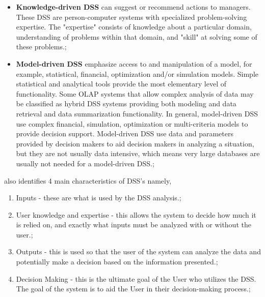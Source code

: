 \begin {itemize}
\item \textbf{Knowledge-driven DSS} can suggest or recommend actions to managers. These DSS are person-computer systems with specialized problem-solving expertise. The "expertise" consists of knowledge about a particular domain, understanding of problems within that domain, and "skill" at solving some of these problems.;
\item \textbf{Model-driven DSS} emphasize access to and manipulation of a model, for example, statistical, financial, optimization and/or simulation models. Simple statistical and analytical tools provide the most elementary level of functionality. Some OLAP systems that allow complex analysis of data may be classified as hybrid DSS systems providing both modeling and data retrieval and data summarization functionality. In general, model-driven DSS use complex financial, simulation, optimization or multi-criteria models to provide decision support. Model-driven DSS use data and parameters provided by decision makers to aid decision makers in analyzing a situation, but they are not usually data intensive, which means very large databases are usually not needed for a model-driven DSS.;
\end {itemize}

\cite{Power2003} also identifies 4 main characteristics of DSS's namely,

\begin {enumerate}
\item Inputs - these are what is used by the DSS analysis.;
\item User knowledge and expertise - this allows the system to decide how much it is relied on, and exactly what inputs must be analyzed with or without the user.;
\item Outputs - this is used so that the user of the system can analyze the data and potentially make a decision based on the information presented.;
\item Decision Making - this is the ultimate goal of the User who utilizes the DSS. The goal of the system is to aid the User in their decision-making process.;
\end {enumerate}
